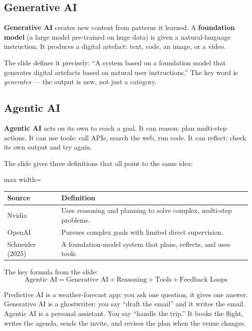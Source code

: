 \documentclass[a4paper,11pt]{article}
\newcommand{\vocab}[1]{\textbf{\color{navy}#1}}
\begin{document}
\subsection{Generative AI}

\vocab{Generative AI} creates new content from patterns it learned.
A \vocab{foundation model} (a large model pre-trained on huge data) is given a natural-language instruction.
It produces a digital artefact: text, code, an image, or a video.

The slide defines it precisely:
``A system based on a foundation model that generates digital artefacts based on natural user instructions.''
The key word is \emph{generates} --- the output is new, not just a category.

\subsection{Agentic AI}

\vocab{Agentic AI} acts on its own to reach a goal.
It can reason: plan multi-step actions.
It can use tools: call APIs, search the web, run code.
It can reflect: check its own output and try again.

The slide gives three definitions that all point to the same idea:

\begin{center}
\begin{adjustbox}{max width=\linewidth}
\begin{tabular}{lp{9cm}}
\toprule
\textbf{Source} & \textbf{Definition} \\
\midrule
Nvidia & Uses reasoning and planning to solve complex, multi-step problems. \\
OpenAI & Pursues complex goals with limited direct supervision. \\
Schneider (2025) & A foundation-model system that plans, reflects, and uses tools. \\
\bottomrule
\end{tabular}
\end{adjustbox}
\end{center}

The key formula from the slide:
\[
\text{Agentic AI} = \text{Generative AI} + \text{Reasoning} + \text{Tools} + \text{Feedback Loops}
\]

\begin{everyday}
Predictive AI is a weather-forecast app: you ask one question, it gives one answer.
Generative AI is a ghostwriter: you say ``draft the email'' and it writes the email.
Agentic AI is a personal assistant.
You say ``handle the trip.''
It books the flight, writes the agenda, sends the invite, and revises the plan when the venue changes.
\end{everyday}
\end{document}
